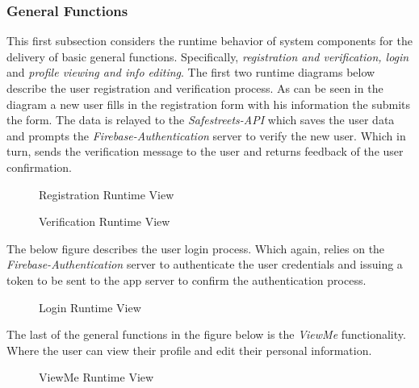 \subsubsection{General Functions}
This first subsection considers the runtime behavior of system components for the delivery of basic general functions. Specifically, \emph{registration and verification, login} and \emph{profile viewing and info editing}. The first two runtime diagrams below describe the user registration and verification process. As can be seen in the diagram a new user fills in the registration form with his information the submits the form. The data is relayed to the \emph{Safestreets-API} which saves the user data and prompts the \emph{Firebase-Authentication} server to verify the new user. Which in turn, sends the verification message to the user and returns feedback of the user confirmation.

\begin{figure}[H]
\caption{Registration Runtime View}
\label{fig:RuntimeReg}
\centering

\end{figure}

\begin{figure}[H]
\caption{Verification Runtime View}
\label{fig:RuntimeVer}
\centering

\end{figure}

The below figure describes the user login process. Which again, relies on the \emph{Firebase-Authentication} server to authenticate the user credentials and issuing a token to be sent to the app server to confirm the authentication process.
\begin{figure}[H]
\caption{Login Runtime View}
\label{fig:RuntimeLog}
\centering

\end{figure}

The last of the general functions in the figure below is the \emph{ViewMe} functionality. Where the user can view their profile and edit their personal information.
\begin{figure}[H]
\caption{ViewMe Runtime View}
\label{fig:RuntimeProf}
\centering

\end{figure}